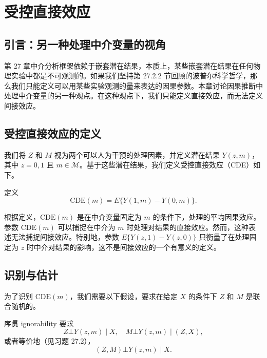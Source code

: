 \chapter{受控直接效应}
\label{chapter::controlled-direct-effect}

\section{引言：另一种处理中介变量的视角}

第 27 章中介分析框架依赖于嵌套潜在结果，本质上，某些嵌套潜在结果在任何物理实验中都是不可观测的。如果我们坚持第 27.2.2 节回顾的波普尔科学哲学，那么我们只能定义可以用某些实验观测的量来表达的因果参数。本章讨论因果推断中处理中介变量的另一种观点。在这种观点下，我们只能定义直接效应，而无法定义间接效应。

\section{受控直接效应的定义}
\label{sec::cde-definition}

我们将 $Z$ 和 $M$ 视为两个可以人为干预的处理因素，并定义潜在结果 $Y(z,m)$，其中 $z=0,1$ 且 $m\in\mathcal{M}$。基于这些潜在结果，我们定义受控直接效应（CDE）如下。

\begin{Definition}
\label{def::cde}
定义
\begin{equation}
\label{eq::cde}
\mathrm{CDE}(m) = E\{Y(1,m) - Y(0,m)\}.
\end{equation}
\end{Definition}

根据定义，$\mathrm{CDE}(m)$ 是在中介变量固定为 $m$ 的条件下，处理的平均因果效应。参数 $\mathrm{CDE}(m)$ 可以捕捉在中介为 $m$ 时处理对结果的直接效应。然而，这种表述无法捕捉间接效应。特别地，参数 $E\{Y(z,1)-Y(z,0)\}$ 只衡量了在处理固定为 $z$ 时中介对结果的影响，这不是间接效应的一个有意义的定义。

\section{识别与估计}
\label{sec::cde-identification}

为了识别 $\mathrm{CDE}(m)$，我们需要以下假设，要求在给定 $X$ 的条件下 $Z$ 和 $M$ 是联合随机的。

\begin{Assumption}[序贯 ignorability]
\label{assume::sequential-ignorability}
序贯 ignorability 要求
\begin{equation}
Z \bot Y(z,m) \mid X, \quad M \bot Y(z,m) \mid (Z,X),
\end{equation}
或者等价地（见习题 27.2），
\begin{equation}
(Z,M) \bot Y(z,m) \mid X.
\end{equation}
\end{Assumption}

